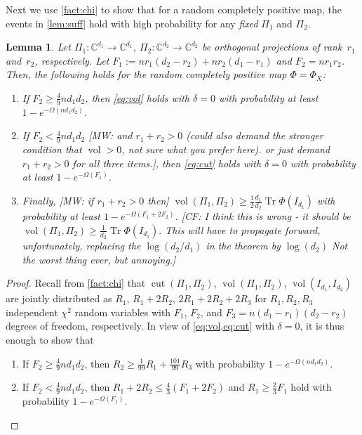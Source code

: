 \documentclass[aos]{imsart}
\newtheorem{lemma}[theorem]{Lemma}
\theoremstyle{definition}
\numberwithin{equation}{section}
\DeclareMathOperator{\vol}{vol}
\DeclareMathOperator{\cut}{cut}
\DeclareMathOperator{\tr}{Tr}
\newcommand{\C}{{\mathbb{C}}}
\newcommand{\CF}[1]{{\color{purple}[CF: #1]}}
\newcommand{\MW}[1]{{\color{red}[MW: #1]}}
\newcommand{\CF}[1]{{}}
\newcommand{\MW}[1]{{}}
\begin{document}
\begin{appendix}
Next we use \cref{fact:chi} to show that for a random completely positive map, the events in \cref{lem:suff} hold with high probability for any \emph{fixed} $\Pi_1$ and $\Pi_2$.

\begin{lemma}\label{lem:probabilities}
Let $\Pi_1\colon \C^{d_1} \to \C^{d_1}$, $\Pi_2\colon \C^{d_2} \to \C^{d_2}$ be orthogonal projections of rank~$r_1$ and~$r_2$, respectively.
Let $F_1:= n r_1(d_2 - r_2) + n r_2(d_1-r_1)$ and $F_2 = n r_1 r_2$.
Then, the following holds for the random completely positive map $\Phi=\Phi_X$:
\begin{enumerate}
\item If $F_2 \geq \frac49 n d_1 d_2$, then \cref{eq:vol} holds with $\delta = 0$ with probability at least $1 - e^{-\Omega( n d_1 d_2)}$.
\item If $F_2 < \frac49 n d_1 d_2$ \MW{and $r_1 + r_2 > 0$ (could also demand the stronger condition that $\vol>0$, not sure what you prefer here). or just demand $r_1+r_2>0$ for all three items.}, then \cref{eq:cut} holds with $\delta = 0$ with probability at least $1 - e^{-\Omega( F_1)}$.
\item Finally, \MW{if $r_1 + r_2 > 0$ then} $\vol(\Pi_1, \Pi_2) \geq \frac12 \frac{d_1}{d_2} \tr \Phi(I_{d_1})$ with probability at least $1 - e^{- \Omega(F_1 + 2F_2)}$. \CF{I think this is wrong - it should be $\vol(\Pi_1, \Pi_2) \geq  \frac{1}{d_2} \tr \Phi(I_{d_1}).$ This will have to propagate forward, unfortunately, replacing the $\log(d_2/d_1)$ in the theorem by $\log (d_2)$ Not the worst thing ever, but annoying.}
\end{enumerate}
\end{lemma}
\begin{proof}
Recall from \cref{fact:chi} that $\cut(\Pi_1, \Pi_2)$, $\vol(\Pi_1, \Pi_2)$, $\vol(I_{d_1}, I_{d_2})$ are jointly distributed as $R_1$, $R_1 + 2R_2$, $2R_1 + 2R_2 + 2R_3$ for $R_1, R_2, R_3$ independent $\chi^2$ random variables with $F_1$, $F_2$, and $F_3 = n(d_1-r_1)(d_2-r_2)$ degrees of freedom, respectively.
In view of \cref{eq:vol,eq:cut} with $\delta=0$, it is thus enough to show that
\begin{enumerate}
\item If $F_2 \geq \frac49 n d_1 d_2$, then $R_2 \geq \frac1{99} R_1 + \frac{101}{99} R_3$ with probability $1 - e^{-\Omega( n d_1 d_2)}$.
\item If $F_2 < \frac49 n d_1 d_2$, then $R_1 + 2R_2 \leq \frac43 (F_1 + 2F_2)$ and $R_1 \geq \frac23 F_1$ hold with probability $1 - e^{-\Omega(F_1)}$.

\end{enumerate}
\end{proof}
\end{appendix}
\end{document}
